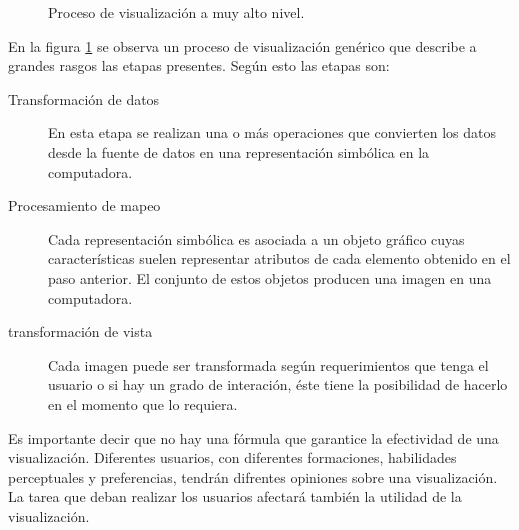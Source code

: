 \documentclass[12pt]{article}
\begin{document}
\begin{figure}[h] %
\caption{Proceso de visualización a muy alto nivel. }
\label{fig:proc_visualizacion}
\end{figure}

En la figura \ref{fig:proc_visualizacion} se observa un proceso de visualización genérico que describe a grandes rasgos las etapas presentes. Según esto las etapas son:

\begin{description}
	\item[Transformación de datos] En esta etapa se realizan una o más operaciones que convierten los datos desde la fuente de datos en una representación simbólica en la computadora. 
	
	\item[Procesamiento de mapeo] Cada representación simbólica es asociada a un objeto gráfico cuyas características suelen representar atributos de cada elemento obtenido en el paso anterior. El conjunto de estos objetos producen una imagen en una computadora.
	
	\item[transformación de vista] Cada imagen puede ser transformada según requerimientos que tenga el usuario o si hay un grado de interación, éste tiene la posibilidad de hacerlo en el momento que lo requiera.
	
\end{description}


Es importante decir que no hay una fórmula que garantice la efectividad de una visualización. Diferentes usuarios, con diferentes formaciones, habilidades perceptuales y preferencias, tendrán difrentes opiniones sobre una visualización. La tarea que deban realizar los usuarios afectará también la utilidad de la visualización.
\end{document}
